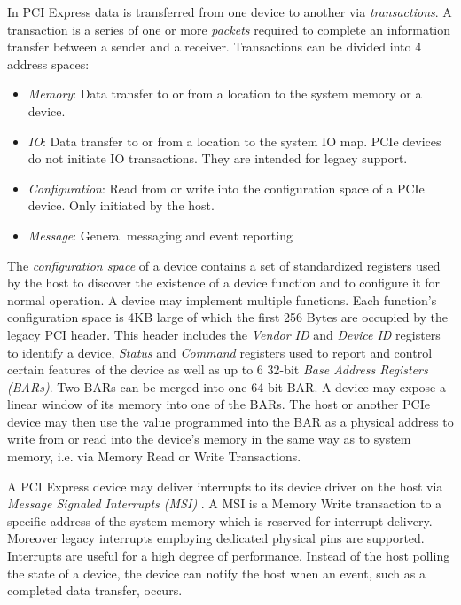 In PCI Express data is transferred from one device to another via \emph{transactions}.
A transaction is a series of one or more \emph{packets} required to complete an information transfer between a sender and a receiver. \cite{pcie}
Transactions can be divided into 4 address spaces:
\begin{itemize}
	\item \emph{Memory}: Data transfer to or from a location to the system memory or a device.
	\item \emph{IO}: Data transfer to or from a location to the system IO map. PCIe devices do not initiate IO transactions. They are intended for legacy support.
	\item \emph{Configuration}: Read from or write into the configuration space of a PCIe device. Only initiated by the host.
	\item \emph{Message}: General messaging and event reporting
\end{itemize}



The \emph{configuration space} of a device contains a set of standardized registers used by the host to discover the existence of a device function and to configure it for normal operation.
A device may implement multiple functions.
Each function's configuration space is 4KB large of which the first 256 Bytes are occupied by the legacy PCI header.
This header includes the \emph{Vendor ID} and \emph{Device ID} registers to identify a device, \emph{Status} and \emph{Command} registers used to report and control certain features of the device as well as up to 6 32-bit \emph{Base Address Registers (BARs)}. \cite{pcie} 
Two BARs can be merged into one 64-bit BAR.
A device may expose a linear window of its memory into one of the BARs.
The host or another PCIe device may then use the value programmed into the BAR as a physical address to write from or read into the device's memory in the same way as to system memory, i.e. via Memory Read or Write Transactions. \cite{rdma}



A PCI Express device may deliver interrupts to its device driver on the host via \emph{Message Signaled Interrupts (MSI)} \cite{pcie}.
A MSI is a Memory Write transaction to a specific address of the system memory which is reserved for interrupt delivery.
Moreover legacy interrupts employing dedicated physical pins are supported. Interrupts are useful for a high degree of performance.
Instead of the host polling the state of a device, the device can notify the host when an event, such as a completed data transfer, occurs.

